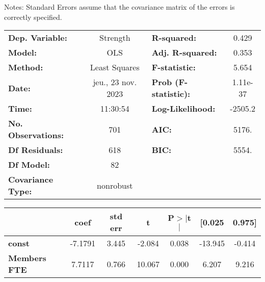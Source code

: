 \documentclass[ 11pt]{article}
\begin{document}
Notes: \newline
 [1] Standard Errors assume that the covariance matrix of the errors is correctly specified.
 
 
  \newpage
  \begin{center}
\begin{tabular}{lclc}
\toprule
\textbf{Dep. Variable:}                                    &      Strength      & \textbf{  R-squared:         } &     0.429   \\
\textbf{Model:}                                            &        OLS         & \textbf{  Adj. R-squared:    } &     0.353   \\
\textbf{Method:}                                           &   Least Squares    & \textbf{  F-statistic:       } &     5.654   \\
\textbf{Date:}                                             & jeu., 23 nov. 2023 & \textbf{  Prob (F-statistic):} &  1.11e-37   \\
\textbf{Time:}                                             &      11:30:54      & \textbf{  Log-Likelihood:    } &   -2505.2   \\
\textbf{No. Observations:}                                 &          701       & \textbf{  AIC:               } &     5176.   \\
\textbf{Df Residuals:}                                     &          618       & \textbf{  BIC:               } &     5554.   \\
\textbf{Df Model:}                                         &           82       & \textbf{                     } &             \\
\textbf{Covariance Type:}                                  &     nonrobust      & \textbf{                     } &             \\
\bottomrule
\end{tabular}
\begin{longtable}{lcccccc}
                                                           & \textbf{coef} & \textbf{std err} & \textbf{t} & \textbf{P$> |$t$|$} & \textbf{[0.025} & \textbf{0.975]}  \\
\midrule
\textbf{const}                                             &      -7.1791  &        3.445     &    -2.084  &         0.038        &      -13.945    &       -0.414     \\
\textbf{Members FTE}                                       &       7.7117  &        0.766     &    10.067  &         0.000        &        6.207    &        9.216     \\

\end{longtable}
\end{center}
\end{document}
